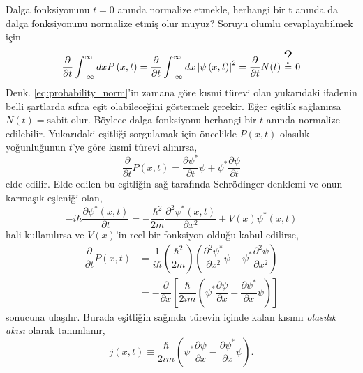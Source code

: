\documentclass[a4paper,12pt, twoside]{article}
\begin{document}
Dalga fonksiyonunu $t=0$ anında normalize etmekle, herhangi bir t anında da dalga fonksiyonunu normalize etmiş olur muyuz? Soruyu olumlu cevaplayabilmek için 
\begin{equation}
\dfrac {\partial }{\partial t} \int ^{\infty }_{-\infty }dxP\left( x,t\right) = \dfrac {\partial }{\partial t} \int ^{\infty }_{-\infty }dx\left| \psi \left( x,t\right) \right| ^{2}= \dfrac {\partial }{\partial t}N(t) \stackrel{\scalebox{2}{?}}{=} 0 
\label{eq:probability_norm_derivative}
\end{equation}
Denk. \ref{eq:probability_norm}'in zamana göre kısmi türevi olan yukarıdaki ifadenin belli şartlarda sıfıra eşit olabileceğini göstermek gerekir. Eğer eşitlik sağlanırsa $N(t) = \text{sabit}$ olur. Böylece dalga fonksiyonu herhangi bir $t$ anında normalize edilebilir. Yukarıdaki eşitliği sorgulamak için öncelikle $P(x,t)$ olasılık yoğunluğunun $t$'ye göre kısmi türevi alınırsa,
\begin{equation}
\dfrac {\partial }{\partial t}P\left( x,t\right) = \dfrac {\partial \psi ^{\ast }}{\partial t}\psi +\psi ^{\ast }\dfrac {\partial \psi }{\partial t}
\label{eq:probability_derivative_t}
\end{equation}
elde edilir. Elde edilen bu eşitliğin sağ tarafında Schrödinger denklemi ve onun karmaşık eşleniği olan,
\begin{equation}
-i\hbar \dfrac {\partial \psi ^{\ast }\left( x,t\right) }{\partial t}=-\dfrac {\hbar ^{2}}{2m}\dfrac {\partial ^{2}\psi ^{\ast }\left( x,t\right) }{\partial x^{2}}+V\left( x\right) \psi ^{\ast }\left( x,t\right)
\label{eq:schrodinger_conjugate}
\end{equation}
hali kullanılırsa ve $V(x)$'in reel bir fonksiyon olduğu kabul edilirse,
\begin{align}
\dfrac {\partial }{\partial t}P\left( x,t\right) &=\dfrac {1}{i\hbar }\left( \dfrac {\hbar ^{2}}{2m}\right) \left( \dfrac {\partial ^{2}\psi ^{\ast }}{\partial x^{2}}\psi -\psi ^{\ast }\dfrac {\partial ^{2}\psi }{\partial x^{2}}\right) \\
&=-\dfrac {\partial }{\partial x}\left[ \dfrac {\hbar }{2im}\left( \psi ^{\ast }\dfrac {\partial \psi }{\partial x}-\dfrac {\partial \psi ^{\ast }}{\partial x}\psi \right) \right]
\end{align}
sonucuna ulaşılır. Burada eşitliğin sağında türevin içinde kalan kısımı \emph{olasılık akısı} olarak tanımlanır,
\begin{equation}
j(x,t)\equiv \dfrac {\hbar }{2im}\left( \psi ^{\ast }\dfrac {\partial \psi }{\partial x}-\dfrac {\partial \psi ^{\ast }}{\partial x}\psi \right).
\label{eq:probability_current}
\end{equation}
\end{document}
